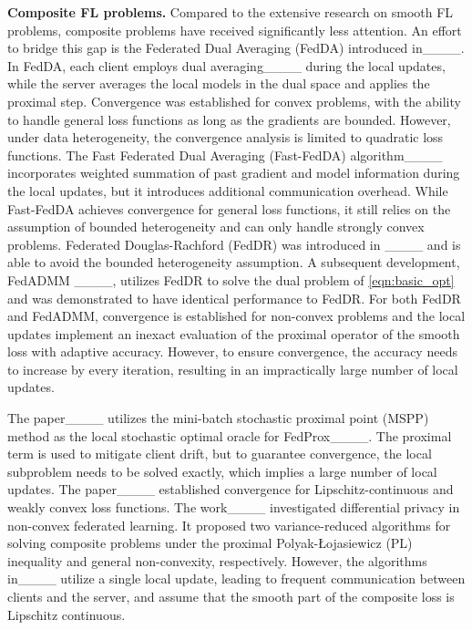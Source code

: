 {\bf Composite FL problems.} 
Compared to the extensive research on smooth FL problems,  composite problems have received significantly less attention. An effort to bridge this gap is the Federated Dual Averaging (FedDA) introduced in____. In FedDA, each client employs dual averaging____ during the local updates,  while the server averages the local models in the dual space and applies the proximal step. 
Convergence was established for convex problems, with the ability to handle general loss functions as long as the gradients are bounded. However, under data heterogeneity, the convergence analysis is limited to quadratic loss functions.
%
The Fast Federated Dual Averaging (Fast-FedDA) algorithm____ incorporates weighted summation of past gradient and model information during the local updates, but it introduces additional communication overhead.  While Fast-FedDA achieves convergence for general loss functions, it still relies on the assumption of bounded heterogeneity and can only handle strongly convex problems.
%
Federated Douglas-Rachford (FedDR) was introduced in ____ and is able to avoid the bounded heterogeneity assumption. A subsequent development, FedADMM ____, utilizes FedDR to solve the dual problem of \eqref{eqn:basic_opt} and was demonstrated to have identical performance to FedDR. 
%
For both FedDR and FedADMM, convergence is established for non-convex problems and the local updates implement an inexact evaluation of the proximal operator of the smooth loss with adaptive accuracy. However, to ensure convergence, the accuracy needs to increase by every iteration, resulting in an impractically large number of local updates.

{The paper____ utilizes the mini-batch stochastic proximal point (MSPP) method as the local
stochastic optimal oracle for FedProx____. The proximal term is used to mitigate client drift, but to guarantee convergence, the local subproblem needs to be solved exactly, which implies a large number of local updates. The paper____ established convergence 
for Lipschitz-continuous and weakly convex loss functions.
The work____ investigated differential privacy in non-convex federated learning. It proposed two variance-reduced algorithms for solving composite problems under the proximal Polyak-{\L}ojasiewicz (PL) inequality and general non-convexity, respectively. However, the algorithms in____ utilize a single local update, leading to frequent communication between clients and the server, and
assume that the smooth part of the composite loss is Lipschitz continuous. }